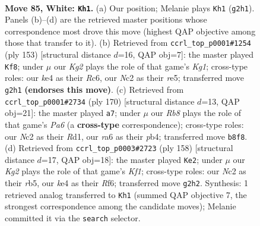 \documentclass[11pt]{article}
\begin{document}
\clearpage

\begin{figure}[p]\centering
\begin{subfigure}{0.46\textwidth}\centering
\resizebox{\linewidth}{!}{%
\newchessgame
\chessboard[
  setfen={1R6/6p1/r4p2/3P3p/4k2P/6P1/2N3K1/8 w - - 9 85},
  showmover=false,
  pgfstyle=straightmove, color=movearrow, markmove={g2-h1}
]}
\caption{}
\end{subfigure}\hfill
\begin{subfigure}{0.46\textwidth}\centering
\resizebox{\linewidth}{!}{%
\newchessgame
\chessboard[
  setfen={6k1/6p1/2r1P2p/4R2P/5P2/1K6/8/8 b - - 2 77},
  showmover=false,
  pgfstyle=straightmove, color=movearrow, markmove={g8-f8}
]}
\caption{}
\end{subfigure}
\\[4pt]
\begin{subfigure}{0.46\textwidth}\centering
\resizebox{\linewidth}{!}{%
\newchessgame
\chessboard[
  setfen={1r6/8/P3k1p1/4P2p/1p3p1P/5P1K/8/3R4 w - - 1 86},
  showmover=false,
  pgfstyle=straightmove, color=movearrow, markmove={a6-a7}
]}
\caption{}
\end{subfigure}\hfill
\begin{subfigure}{0.46\textwidth}\centering
\resizebox{\linewidth}{!}{%
\newchessgame
\chessboard[
  setfen={8/7k/5R2/1r3p1p/6pP/6P1/5P2/5K2 w - - 16 80},
  showmover=false,
  pgfstyle=straightmove, color=movearrow, markmove={f1-e2}
]}
\caption{}
\end{subfigure}
\caption{\textbf{Move 85, White: \texttt{Kh1}.} (a) Our position; Melanie plays \texttt{Kh1} (\texttt{g2h1}). Panels (b)--(d) are the retrieved master positions whose correspondence most drove this move (highest QAP objective among those that transfer to it). (b) Retrieved from \texttt{ccrl\_top\_p0001\#1254} (ply 153) [structural distance $d$=16, QAP obj=7]: the master played \texttt{Kf8}; under $\mu$ our \emph{Kg2} plays the role of that game's \emph{Kg1}; cross-type roles: our \emph{k}e4 as their \emph{R}c6, our \emph{N}c2 as their \emph{r}e5; transferred move \texttt{g2h1} \textbf{(endorses this move)}. (c) Retrieved from \texttt{ccrl\_top\_p0001\#2734} (ply 170) [structural distance $d$=13, QAP obj=21]: the master played \texttt{a7}; under $\mu$ our \emph{Rb8} plays the role of that game's \emph{Pa6} (a \textbf{cross-type} correspondence); cross-type roles: our \emph{N}c2 as their \emph{R}d1, our \emph{r}a6 as their \emph{p}b4; transferred move \texttt{b8f8}. (d) Retrieved from \texttt{ccrl\_top\_p0003\#2723} (ply 158) [structural distance $d$=17, QAP obj=18]: the master played \texttt{Ke2}; under $\mu$ our \emph{Kg2} plays the role of that game's \emph{Kf1}; cross-type roles: our \emph{N}c2 as their \emph{r}b5, our \emph{k}e4 as their \emph{R}f6; transferred move \texttt{g2h2}. Synthesis: 1 retrieved analog transferred to \texttt{Kh1} (summed QAP objective 7, the strongest correspondence among the candidate moves); Melanie committed it via the \texttt{search} selector.}
\label{fig:thought-m168}
\end{figure}
\end{document}
